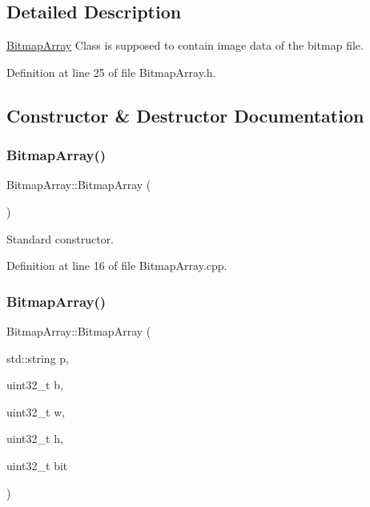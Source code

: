 \subsection{Detailed Description}
\mbox{\hyperlink{classBitmapArray}{Bitmap\+Array}} Class is supposed to contain image data of the bitmap file. 

Definition at line 25 of file Bitmap\+Array.\+h.



\subsection{Constructor \& Destructor Documentation}
\mbox{\label{classBitmapArray_a582e5e54ec078d30fde87ae7b4540f32}} 
\subsubsection{\texorpdfstring{BitmapArray()}{BitmapArray()}\hspace{0.1cm}{\footnotesize\ttfamily [1/3]}}
{\footnotesize\ttfamily Bitmap\+Array\+::\+Bitmap\+Array (\begin{DoxyParamCaption}{ }\end{DoxyParamCaption})}



Standard constructor. 



Definition at line 16 of file Bitmap\+Array.\+cpp.

\mbox{\label{classBitmapArray_ae080c605889bcde457f82c0b8917749d}} 
\subsubsection{\texorpdfstring{BitmapArray()}{BitmapArray()}\hspace{0.1cm}{\footnotesize\ttfamily [2/3]}}
{\footnotesize\ttfamily Bitmap\+Array\+::\+Bitmap\+Array (\begin{DoxyParamCaption}\item[{std\+::string}]{p,  }\item[{uint32\+\_\+t}]{b,  }\item[{uint32\+\_\+t}]{w,  }\item[{uint32\+\_\+t}]{h,  }\item[{uint32\+\_\+t}]{bit }\end{DoxyParamCaption})}



